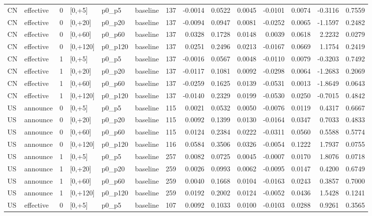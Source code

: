 \begin{tabular}{llrlllrrrrrrrr}
CN & effective & 0 & [0,+5] & p0_p5 & baseline & 137 & -0.0014 & 0.0522 & 0.0045 & -0.0101 & 0.0074 & -0.3116 & 0.7559 \\
CN & effective & 0 & [0,+20] & p0_p20 & baseline & 137 & -0.0094 & 0.0947 & 0.0081 & -0.0252 & 0.0065 & -1.1597 & 0.2482 \\
CN & effective & 0 & [0,+60] & p0_p60 & baseline & 137 & 0.0328 & 0.1728 & 0.0148 & 0.0039 & 0.0618 & 2.2232 & 0.0279 \\
CN & effective & 0 & [0,+120] & p0_p120 & baseline & 137 & 0.0251 & 0.2496 & 0.0213 & -0.0167 & 0.0669 & 1.1754 & 0.2419 \\
CN & effective & 1 & [0,+5] & p0_p5 & baseline & 137 & -0.0016 & 0.0567 & 0.0048 & -0.0110 & 0.0079 & -0.3203 & 0.7492 \\
CN & effective & 1 & [0,+20] & p0_p20 & baseline & 137 & -0.0117 & 0.1081 & 0.0092 & -0.0298 & 0.0064 & -1.2683 & 0.2069 \\
CN & effective & 1 & [0,+60] & p0_p60 & baseline & 137 & -0.0259 & 0.1625 & 0.0139 & -0.0531 & 0.0013 & -1.8649 & 0.0643 \\
CN & effective & 1 & [0,+120] & p0_p120 & baseline & 137 & -0.0140 & 0.2329 & 0.0199 & -0.0530 & 0.0250 & -0.7015 & 0.4842 \\
US & announce & 0 & [0,+5] & p0_p5 & baseline & 115 & 0.0021 & 0.0532 & 0.0050 & -0.0076 & 0.0119 & 0.4317 & 0.6667 \\
US & announce & 0 & [0,+20] & p0_p20 & baseline & 115 & 0.0092 & 0.1399 & 0.0130 & -0.0164 & 0.0347 & 0.7033 & 0.4833 \\
US & announce & 0 & [0,+60] & p0_p60 & baseline & 115 & 0.0124 & 0.2384 & 0.0222 & -0.0311 & 0.0560 & 0.5588 & 0.5774 \\
US & announce & 0 & [0,+120] & p0_p120 & baseline & 116 & 0.0584 & 0.3506 & 0.0326 & -0.0054 & 0.1222 & 1.7937 & 0.0755 \\
US & announce & 1 & [0,+5] & p0_p5 & baseline & 257 & 0.0082 & 0.0725 & 0.0045 & -0.0007 & 0.0170 & 1.8076 & 0.0718 \\
US & announce & 1 & [0,+20] & p0_p20 & baseline & 259 & 0.0026 & 0.0993 & 0.0062 & -0.0095 & 0.0147 & 0.4200 & 0.6749 \\
US & announce & 1 & [0,+60] & p0_p60 & baseline & 259 & 0.0040 & 0.1668 & 0.0104 & -0.0163 & 0.0243 & 0.3857 & 0.7000 \\
US & announce & 1 & [0,+120] & p0_p120 & baseline & 259 & 0.0192 & 0.2002 & 0.0124 & -0.0052 & 0.0436 & 1.5428 & 0.1241 \\
US & effective & 0 & [0,+5] & p0_p5 & baseline & 107 & 0.0092 & 0.1033 & 0.0100 & -0.0103 & 0.0288 & 0.9261 & 0.3565 \\

\end{tabular}
